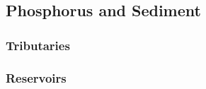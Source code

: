 \subsection{Phosphorus and Sediment}
	\subsubsection{Tributaries}
	\subsubsection{Reservoirs}
\pagebreak